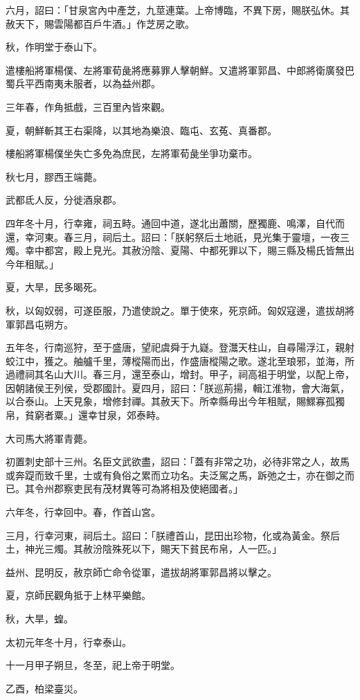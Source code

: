\begin{pinyinscope}
六月，詔曰：「甘泉宮內中產芝，九莖連葉。上帝博臨，不異下房，賜朕弘休。其赦天下，賜雲陽都百戶牛酒。」作芝房之歌。

秋，作明堂于泰山下。

遣樓船將軍楊僕、左將軍荀彘將應募罪人擊朝鮮。又遣將軍郭昌、中郎將衛廣發巴蜀兵平西南夷未服者，以為益州郡。

三年春，作角抵戲，三百里內皆來觀。

夏，朝鮮斬其王右渠降，以其地為樂浪、臨屯、玄菟、真番郡。

樓船將軍楊僕坐失亡多免為庶民，左將軍荀彘坐爭功棄市。

秋七月，膠西王端薨。

武都氐人反，分徙酒泉郡。

四年冬十月，行幸雍，祠五畤。通回中道，遂北出蕭關，歷獨鹿、鳴澤，自代而還，幸河東。春三月，祠后土。詔曰：「朕躬祭后土地祇，見光集于靈壇，一夜三燭。幸中都宮，殿上見光。其赦汾陰、夏陽、中都死罪以下，賜三縣及楊氏皆無出今年租賦。」

夏，大旱，民多暍死。

秋，以匈奴弱，可遂臣服，乃遣使說之。單于使來，死京師。匈奴寇邊，遣拔胡將軍郭昌屯朔方。

五年冬，行南巡狩，至于盛唐，望祀虞舜于九嶷。登灊天柱山，自尋陽浮江，親射蛟江中，獲之。舳艫千里，薄樅陽而出，作盛唐樅陽之歌。遂北至琅邪，並海，所過禮祠其名山大川。春三月，還至泰山，增封。甲子，祠高祖于明堂，以配上帝，因朝諸侯王列侯，受郡國計。夏四月，詔曰：「朕巡荊揚，輯江淮物，會大海氣，以合泰山。上天見象，增修封禪。其赦天下。所幸縣毋出今年租賦，賜鰥寡孤獨帛，貧窮者粟。」還幸甘泉，郊泰畤。

大司馬大將軍青薨。

初置刺史部十三州。名臣文武欲盡，詔曰：「蓋有非常之功，必待非常之人，故馬或奔踶而致千里，士或有負俗之累而立功名。夫泛駕之馬，跅弛之士，亦在御之而已。其令州郡察吏民有茂材異等可為將相及使絕國者。」

六年冬，行幸回中。春，作首山宮。

三月，行幸河東，祠后土。詔曰：「朕禮首山，昆田出珍物，化或為黃金。祭后土，神光三燭。其赦汾陰殊死以下，賜天下貧民布帛，人一匹。」

益州、昆明反，赦京師亡命令從軍，遣拔胡將軍郭昌將以擊之。

夏，京師民觀角抵于上林平樂館。

秋，大旱，蝗。

太初元年冬十月，行幸泰山。

十一月甲子朔旦，冬至，祀上帝于明堂。

乙酉，柏梁臺災。


\end{pinyinscope}
